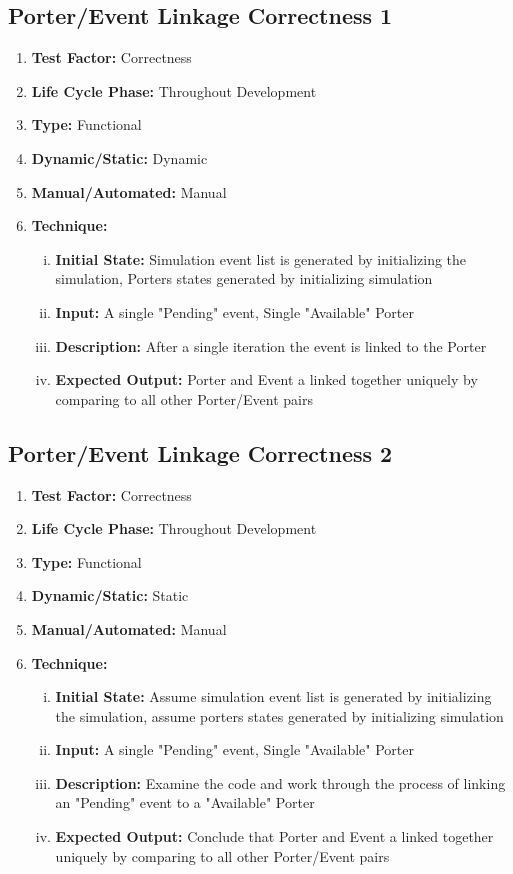 \documentclass[paper=letter, fontsize=10pt]{scrartcl}
\numberwithin{equation}{section}		%
\numberwithin{figure}{section}			%
\numberwithin{table}{section}				%
\begin{document}
\subsection{Porter/Event Linkage Correctness 1}
\begin{enumerate}[] 	
	\item \textbf{Test Factor:} Correctness 
	\item \textbf{Life Cycle Phase:} Throughout Development
	\item \textbf{Type:} Functional
	\item \textbf{Dynamic/Static:} Dynamic
	\item \textbf{Manual/Automated:} Manual
	\item \textbf{Technique:}
		\begin{enumerate}[(i)]
			\item \textbf{Initial State:} Simulation event list is generated by initializing the simulation, Porters states generated by initializing simulation
			\item \textbf{Input:} A single "Pending" event, Single "Available" Porter
			\item \textbf{Description:} After a single iteration the event is linked to the Porter
			\item \textbf{Expected Output:} Porter and Event a linked together uniquely by comparing to all other Porter/Event pairs
		\end{enumerate}
\end{enumerate}

\subsection{Porter/Event Linkage Correctness 2}
\begin{enumerate}[] 	
	\item \textbf{Test Factor:} Correctness 
	\item \textbf{Life Cycle Phase:} Throughout Development
	\item \textbf{Type:} Functional
	\item \textbf{Dynamic/Static:} Static
	\item \textbf{Manual/Automated:} Manual
	\item \textbf{Technique:}
		\begin{enumerate}[(i)]
			\item \textbf{Initial State:} Assume simulation event list is generated by initializing the simulation, assume porters states generated by initializing simulation
			\item \textbf{Input:} A single "Pending" event, Single "Available" Porter
			\item \textbf{Description:} Examine the code and work through the process of linking an "Pending" event to a "Available" Porter
			\item \textbf{Expected Output:} Conclude that Porter and Event a linked together uniquely by comparing to all other Porter/Event pairs
		\end{enumerate}
\end{enumerate}
\end{document}
